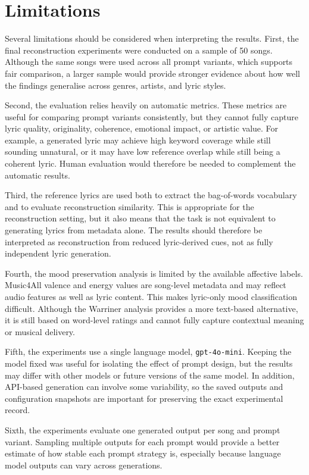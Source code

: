 \section{Limitations}

Several limitations should be considered when interpreting the results. First, the final reconstruction experiments were conducted on a sample of 50 songs. Although the same songs were used across all prompt variants, which supports fair comparison, a larger sample would provide stronger evidence about how well the findings generalise across genres, artists, and lyric styles.

Second, the evaluation relies heavily on automatic metrics. These metrics are useful for comparing prompt variants consistently, but they cannot fully capture lyric quality, originality, coherence, emotional impact, or artistic value. For example, a generated lyric may achieve high keyword coverage while still sounding unnatural, or it may have low reference overlap while still being a coherent lyric. Human evaluation would therefore be needed to complement the automatic results.

Third, the reference lyrics are used both to extract the bag-of-words vocabulary and to evaluate reconstruction similarity. This is appropriate for the reconstruction setting, but it also means that the task is not equivalent to generating lyrics from metadata alone. The results should therefore be interpreted as reconstruction from reduced lyric-derived cues, not as fully independent lyric generation.

Fourth, the mood preservation analysis is limited by the available affective labels. Music4All valence and energy values are song-level metadata and may reflect audio features as well as lyric content. This makes lyric-only mood classification difficult. Although the Warriner analysis provides a more text-based alternative, it is still based on word-level ratings and cannot fully capture contextual meaning or musical delivery.

Fifth, the experiments use a single language model, \texttt{gpt-4o-mini}. Keeping the model fixed was useful for isolating the effect of prompt design, but the results may differ with other models or future versions of the same model. In addition, API-based generation can involve some variability, so the saved outputs and configuration snapshots are important for preserving the exact experimental record.

Sixth, the experiments evaluate one generated output per song and prompt variant. Sampling multiple outputs for each prompt would provide a better estimate of how stable each prompt strategy is, especially because language model outputs can vary across generations.

